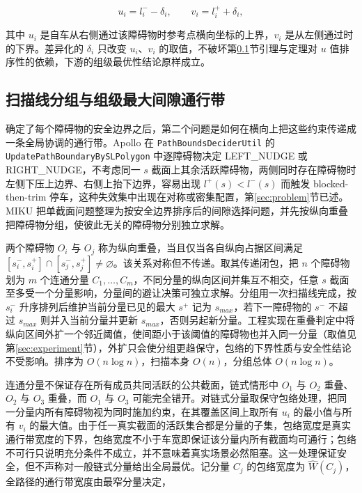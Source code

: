 \documentclass[a4paper,zihao=5]{ctexart}
\theoremstyle{definition}
\begin{document}
\begin{equation}
    u_i = l_i^{-} - \delta_i, \qquad v_i = l_i^{+} + \delta_i,
    \label{eq:dynamic_uv}
\end{equation}

其中 $u_i$ 是自车从右侧通过该障碍物时参考点横向坐标的上界，$v_i$ 是从左侧通过时的下界。差异化的 $\delta_i$ 只改变 $u_i$、$v_i$ 的取值，不破坏第\ref{sec:method_band}节引理与定理对 $u$ 值排序性的依赖，下游的组级最优性结论原样成立。

\subsection{扫描线分组与组级最大间隙通行带}
\label{sec:method_band}

确定了每个障碍物的安全边界之后，第二个问题是如何在横向上把这些约束传递成一条全局协调的通行带。Apollo 在 \texttt{PathBoundsDeciderUtil} 的 \texttt{UpdatePathBoundaryBySLPolygon} 中逐障碍物决定 LEFT\_NUDGE 或 RIGHT\_NUDGE，不考虑同一 $s$ 截面上其余活跃障碍物，两侧同时存在障碍物时左侧下压上边界、右侧上抬下边界，容易出现 $l^{+}(s)<l^{-}(s)$ 而触发 blocked-then-trim 停车，这种失效集中出现在对称或密集配置，第\ref{sec:problem}节已述。MIKU 把单截面问题整理为按安全边界排序后的间隙选择问题，并先按纵向重叠把障碍物分组，使彼此无关的障碍物分别独立求解。

两个障碍物 $O_i$ 与 $O_j$ 称为纵向重叠，当且仅当各自纵向占据区间满足 $[s_i^{-}, s_i^{+}] \cap [s_j^{-}, s_j^{+}] \neq \varnothing$。该关系对称但不传递。取其传递闭包，把 $n$ 个障碍物划为 $m$ 个连通分量 $C_1, \ldots, C_m$，不同分量的纵向区间并集互不相交，任意 $s$ 截面至多受一个分量影响，分量间的避让决策可独立求解。分组用一次扫描线完成，按 $s_i^{-}$ 升序排列后维护当前分量已见的最大 $s^{+}$ 记为 $s_{max}$，若下一障碍物的 $s^{-}$ 不超过 $s_{max}$ 则并入当前分量并更新 $s_{max}$，否则另起新分量。工程实现在重叠判定中将纵向区间外扩一个邻近阈值，使间距小于该阈值的障碍物也并入同一分量（取值见第\ref{sec:experiment}节），外扩只会使分组更趋保守，包络的下界性质与安全性结论不受影响。排序为 $O(n\log n)$，扫描本身 $O(n)$，分组总体 $O(n\log n)$。

连通分量不保证存在所有成员共同活跃的公共截面，链式情形中 $O_1$ 与 $O_2$ 重叠、$O_2$ 与 $O_3$ 重叠，而 $O_1$ 与 $O_3$ 可能完全错开。对链式分量取保守包络处理，把同一分量内所有障碍物视为同时施加约束，在其覆盖区间上取所有 $u_i$ 的最小值与所有 $v_i$ 的最大值。由于任一真实截面的活跃集合都是分量的子集，包络宽度是真实通行带宽度的下界，包络宽度不小于车宽即保证该分量内所有截面均可通行；包络不可行只说明充分条件不成立，并不意味着真实场景必然阻塞。这一处理保证安全，但不声称对一般链式分量给出全局最优。记分量 $C_j$ 的包络宽度为 $\hat{W}(C_j)$，全路径的通行带宽度由最窄分量决定，
\end{document}
